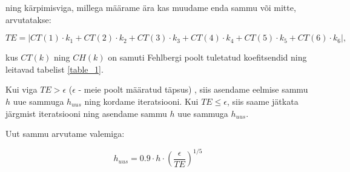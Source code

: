 \begin{flushleft}
ning kärpimisviga, millega määrame ära kas muudame enda sammu või mitte, arvutatakse:

\begin{equation}
TE=|CT(1)\cdot k_{1}+CT(2)\cdot k_{2}+CT(3) \cdot k_{3}+CT(4) \cdot k_{4} + CT(5) \cdot k_{5}+CT(6) \cdot k_{6}|,
\end{equation}

kus $CT(k)$ ning $CH(k)$ on samuti Fehlbergi poolt tuletatud koefitsendid ning leitavad tabelist \ref{table_1}.

Kui viga $TE> \epsilon$ ($\epsilon$ - meie poolt määratud täpsus) , siis asendame eelmise sammu $h$ uue sammuga $h_{uus}$ ning kordame iteratsiooni. Kui $TE \leq \epsilon$, siis saame jätkata järgmist iteratsiooni ning asendame sammu $h$ uue sammuga $h_{uus}$.

Uut sammu arvutame valemiga:

\begin{equation}
h_{uus}=0.9 \cdot h \cdot \left( \dfrac{\epsilon}{TE}\right)^{1/5}
\end{equation}

\end{flushleft}
